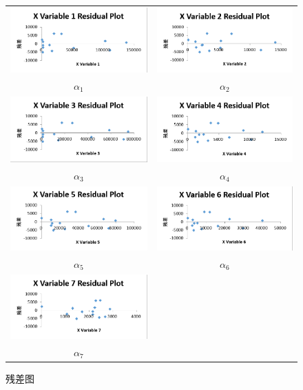 \documentclass[12pt]{article}%
\begin{document}
\begin{figure}[htbp]
  \centering
  \begin{tabular}{cc}
  \includegraphics[width=.45\textwidth]{TIM20180704204332.png} & \includegraphics[width=.45\textwidth]{TIM20180704204923.png}\\
  $\alpha_1$&$\alpha_2$\\
  \includegraphics[width=.45\textwidth]{TIM20180704205304.png}&\includegraphics[width=.45\textwidth]{TIM20180704205341.png}\\
  $\alpha_3$&$\alpha_4$\\
    \includegraphics[width=.45\textwidth]{TIM20180704205413.png} & \includegraphics[width=.45\textwidth]{TIM20180704205443.png}\\
  $\alpha_5$&$\alpha_6$\\
  \includegraphics[width=.45\textwidth]{TIM20180704205513.png}&\ \\
  $\alpha_7$&\ 
  \end{tabular}
  \caption{残差图} 
  \label{Residual Plot} 
\end{figure}
\end{document}
